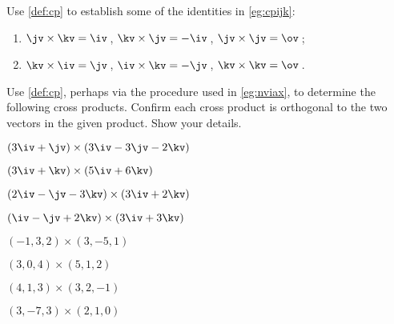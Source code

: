 





\sectionExercises


\begin{exercise} \label{ex:cpijk} 
Use \autoref{def:cp} to establish some of the  identities in \autoref{eg:cpijk}: 
\begin{enumerate}
\item \(\jv\times\kv=\iv\)\,, \(\kv\times\jv=-\iv\)\,, \(\jv\times\jv=\ov\)\,;
\item \(\kv\times\iv=\jv\)\,, \(\iv\times\kv=-\jv\)\,, \(\kv\times\kv=\ov\)\,.
\end{enumerate}
\end{exercise}





\begin{exercise} \label{ex:} 
Use \autoref{def:cp}, perhaps via the procedure used in \autoref{eg:nviax}, to determine the following cross products. 
Confirm each cross product is orthogonal to the two vectors in the given product.
Show your details.
\begin{parts}
\item \((3\iv+\jv)\times(3\iv -3\jv -2\kv)\)
\answer{\(-2\iv +6\jv -12\kv\)}
\item \((3\iv  +\kv)\times(5\iv +6 \kv)\)
\answer{\(-13\jv\)}
\item \((2\iv-\jv -3\kv)\times(3\iv +2\kv)\)
\answer{\(-2\iv -13\jv +3\kv\)}
\item \((\iv -\jv +2\kv)\times(3\iv  +3\kv)\)
\answer{\(-3\iv +3\jv +3\kv\)}
\item \((-1,3,2)\times(3,-5,1)\)
\item \((3,0,4)\times(5,1,2)\)
\item \((4,1,3)\times(3,2,-1)\)
\item \((3,-7,3)\times(2,1,0)\)
\end{parts}
\end{exercise}





